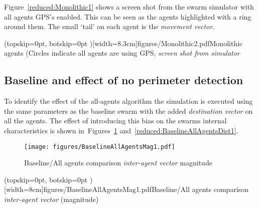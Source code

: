 \documentclass{ieeeaccess}
\begin{document}
Figure~\ref{reduced:Monolithic1} shows a screen shot from the swarm simulator with all agents GPS's enabled. This can be seen as the agents highlighted with a ring around them. The small `tail' on each agent is the \textit{movement vector}.


\Figure[t!](topskip=0pt, botskip=0pt )[width=8.3cm]{figures/Monolithic2.pdf}{Monolithic agents (Circles indicate all agents are using GPS, \textit{screen shot from simulator}\label{reduced:Monolithic1}}

\subsection{Baseline and effect of no perimeter detection\label{section:compareBaselineNoPerimeter}}
To identify the effect of the all-agents algorithm the simulation is executed using the same parameters as the baseline swarm with the added \textit{destination vector} on all the agents. The effect of introducing this bias on the swarms internal characteristics is shown in~Figures~\ref{reduced:BaselineAllAgentsMag1} and~\ref{reduced:BaselineAllAgentsDist1}.
\begin{figure}
\begin{center}
\texttt{[image: figures/BaselineAllAgentsMag1.pdf]}
\end{center}
\caption{Baseline/All agents comparison \textit{inter-agent vector} magnitude\label{reduced:BaselineAllAgentsMag1}}
\end{figure}

\Figure[t!](topskip=0pt, botskip=0pt )[width=8cm]{figures/BaselineAllAgentsMag1.pdf}{Baseline/All agents comparison \textit{inter-agent vector} (magnitude)\label{reduced:BaselineAllAgentsMag1}}
\end{document}
